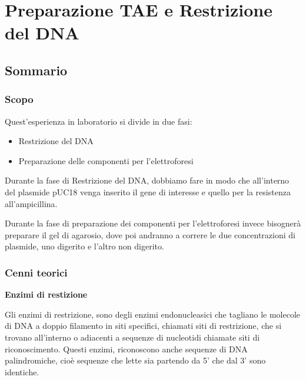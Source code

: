\section{\LARGE{Preparazione TAE e Restrizione del DNA}}

\vspace{0.6cm}


\subsection{Sommario}

\subsubsection{Scopo}

Quest'esperienza in laboratorio si divide in due fasi:

\begin{itemize}

	\item Restrizione del DNA

	\item Preparazione delle componenti per l'elettroforesi

\end{itemize}

Durante la fase di Restrizione del DNA, dobbiamo fare in modo che all'interno del plasmide pUC18 venga inserito il gene di interesse e quello per la resistenza all'ampicillina.
\vspace{0.3cm}

Durante la fase di preparazione dei componenti per l'elettroforesi invece bisognerà preparare il gel di agarosio, dove poi andranno a correre le due concentrazioni di plasmide, uno digerito e l'altro non digerito.

\subsubsection{Cenni teorici}

\textbf{Enzimi di restizione}
\vspace{0.3cm}



Gli enzimi di restrizione, sono degli enzimi endonucleasici che tagliano le molecole di DNA a doppio filamento in siti specifici, chiamati siti di restrizione, che si trovano all'interno o adiacenti a sequenze di nucleotidi chiamate siti di riconoscimento.
Questi enzimi, riconoscono anche sequenze di DNA palindromiche, cioè sequenze che lette sia partendo da 5' che dal 3' sono identiche.

